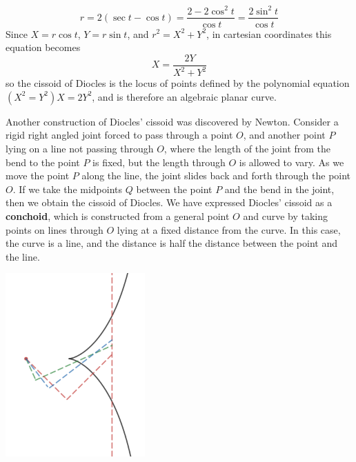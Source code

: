 \begin{example}
    \[ r = 2(\sec t - \cos t) = \frac{2 - 2\cos^2 t}{\cos t} = \frac{2 \sin^2 t}{\cos t}\]
    Since $X = r \cos t$, $Y = r \sin t$, and $r^2 = X^2 + Y^2$, in cartesian coordinates this equation becomes
    \[ X = \frac{2Y}{X^2 + Y^2} \]
    so the cissoid of Diocles is the locus of points defined by the polynomial equation $(X^2 = Y^2) X = 2Y^2$, and is therefore an algebraic planar curve.
\end{example}

\begin{example}
    Another construction of Diocles' cissoid was discovered by Newton. Consider a rigid right angled joint forced to pass through a point $O$, and another point $P$ lying on a line not passing through $O$, where the length of the joint from the bend to the point $P$ is fixed, but the length through $O$ is allowed to vary. As we move the point $P$ along the line, the joint slides back and forth through the point $O$. If we take the midpoints $Q$ between the point $P$ and the bend in the joint, then we obtain the cissoid of Diocles. We have expressed Diocles' cissoid as a {\bf conchoid}, which is constructed from a general point $O$ and curve by taking points on lines through $O$ lying at a fixed distance from the curve. In this case, the curve is a line, and the distance is half the distance between the point and the line.

    \begin{center}
        \includegraphics[width=0.4\textwidth]{algebraicGeometryConchoidDiocles}
    \end{center}


\end{example}
